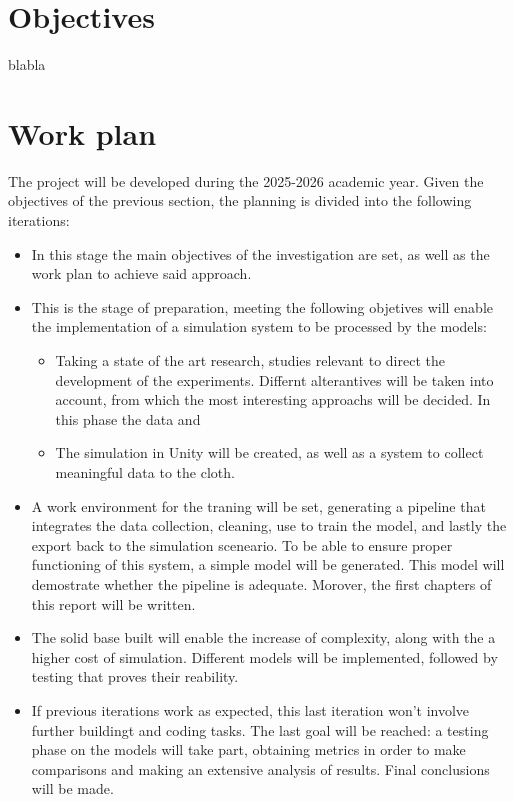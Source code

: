 \section*{Objectives}
blabla

\section*{Work plan}
The project will be developed during the 2025-2026 academic year.
Given the objectives of the previous section, the planning is divided into the following iterations:

\begin{itemize}
	\item In this stage the main objectives of the investigation are set, as well as the work plan to achieve said approach.
	\item This is the stage of preparation, meeting the following objetives will enable the implementation of a simulation system to be processed by the models:
	\begin{itemize}
		\item Taking a state of the art research, studies relevant to direct the development of the experiments. Differnt alterantives will be taken into account, from which the most interesting approachs will be decided. In this phase the data and 
		\item The simulation in Unity will be created, as well as a system to collect meaningful data to the cloth.
	\end{itemize}
	\item A work environment for the traning will be set, generating a pipeline that integrates the data collection, cleaning, use to train the model, and lastly the export back to the simulation sceneario. To be able to ensure proper functioning of this system, a simple model will be generated. This model will demostrate whether the pipeline is adequate. Morover, the first chapters of this report will be written.
	\item The solid base built will enable the increase of complexity, along with the a higher cost of simulation. Different models will be implemented, followed by testing that proves their reability.
	\item If previous iterations work as expected, this last iteration won't involve further buildingt and coding tasks. The last goal will be reached: a testing phase on the models will take part, obtaining metrics in order to make comparisons and making an extensive analysis of results. Final conclusions will be made.
\end{itemize}

